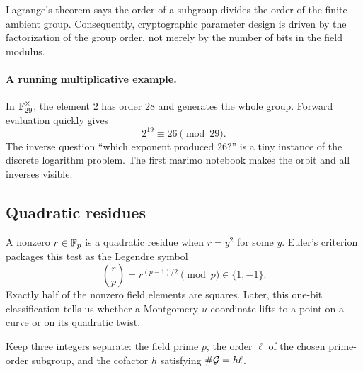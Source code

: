 Lagrange's theorem says the order of a subgroup divides the order of the
finite ambient group. Consequently, cryptographic parameter design is driven
by the factorization of the group order, not merely by the number of bits in
the field modulus.

\paragraph{A running multiplicative example.}
In $\mathbb{F}_{29}^\times$, the element $2$ has order $28$ and generates the whole
group. Forward evaluation quickly gives
\[
  2^{19}\equiv26\pmod{29}.
\]
The inverse question ``which exponent produced $26$?'' is a tiny instance of
the discrete logarithm problem. The first marimo notebook makes the orbit and
all inverses visible.

\subsection{Quadratic residues}

A nonzero $r\in\mathbb{F}_p$ is a quadratic residue when $r=y^2$ for some $y$.
Euler's criterion packages this test as the Legendre symbol
\[
\left(\frac{r}{p}\right)=r^{(p-1)/2}\pmod p\in\{1,-1\}.
\]
Exactly half of the nonzero field elements are squares. Later, this one-bit
classification tells us whether a Montgomery $u$-coordinate lifts to a point
on a curve or on its quadratic twist.

\begin{takeaway}
Keep three integers separate: the field prime $p$, the order $\ell$ of the
chosen prime-order subgroup, and the cofactor $h$ satisfying
$\#\mathcal{G}=h\ell$.
\end{takeaway}
